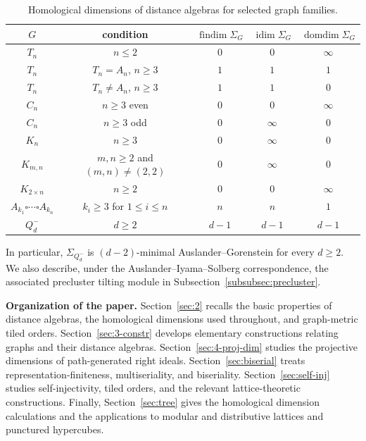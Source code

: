 \documentclass[a4paper,leqno]{amsart}
\begin{document}
\begin{table}[htbp]
\centering
\caption{Homological dimensions of distance algebras for selected graph families.}
\label{tab:intro-homological-dimensions}
\small
\setlength{\tabcolsep}{4pt}
\renewcommand{\arraystretch}{1.15}
\begin{tabular}{c|c|c|c|c}
$G$ & condition & $\operatorname{findim}\Sigma_G$
& $\operatorname{idim}\Sigma_G$
& $\operatorname{domdim}\Sigma_G$ \\ \hline
$T_n$ & $n\leq2$ & $0$ & $0$ & $\infty$ \\
$T_n$ & $T_n=A_n$, $n\geq3$ & $1$ & $1$ & $1$ \\
$T_n$ & $T_n\neq A_n$, $n\geq3$ & $1$ & $1$ & $0$ \\ \hline
$C_n$ & $n\geq3$ even & $0$ & $0$ & $\infty$ \\
$C_n$ & $n\geq3$ odd & $0$ & $\infty$ & $0$ \\ \hline
$K_n$ & $n\geq3$ & $0$ & $\infty$ & $0$ \\ \hline
$K_{m,n}$ & $m,n\geq2$ and $(m,n)\neq(2,2)$
& $0$ & $\infty$ & $0$ \\ \hline
$K_{2\times n}$ & $n\geq2$
& $0$ & $0$ & $\infty$ \\ \hline
$A_{k_1}\square\cdots\square A_{k_n}$
& $k_i\geq3$ for $1\leq i\leq n$ & $n$ & $n$ & $1$ \\ \hline
$Q_d^-$ & $d\geq2$ & $d-1$ & $d-1$ & $d-1$
\end{tabular}
\end{table}

In particular, $\Sigma_{Q_d^-}$ is $(d-2)$-minimal Auslander--Gorenstein for every $d\geq2$.  We also describe, under the Auslander--Iyama--Solberg correspondence, the associated precluster tilting module in Subsection~\ref{subsubsec:precluster}.

\medskip
\noindent
\textbf{Organization of the paper.}
Section~\ref{sec:2} recalls the basic properties of distance algebras, the homological dimensions used throughout, and graph-metric tiled orders.  Section~\ref{sec:3-constr} develops elementary constructions relating graphs and their distance algebras.  Section~\ref{sec:4-proj-dim} studies the projective dimensions of path-generated right ideals.  Section~\ref{sec:biserial} treats representation-finiteness,
multiseriality, and biseriality.  Section~\ref{sec:self-inj} studies
self-injectivity, tiled orders, and the relevant lattice-theoretic
constructions.  Finally, Section~\ref{sec:tree} gives the homological dimension calculations and the applications to modular and distributive lattices and punctured hypercubes.
\end{document}
